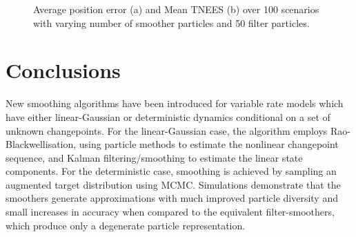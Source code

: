 \documentclass[peerreview,11pt,draftcls,onecolumn]{IEEEtran}
\begin{document}
\begin{figure}
\centering
{}
\caption{Average position error (a) and Mean TNEES (b) over 100 scenarios with varying number of smoother particles and 50 filter particles.}
\label{fig:varying_num_pts}
\end{figure}



\section{Conclusions}

New smoothing algorithms have been introduced for variable rate models which have either linear-Gaussian or deterministic dynamics conditional on a set of unknown changepoints. For the linear-Gaussian case, the algorithm employs Rao-Blackwellisation, using particle methods to estimate the nonlinear changepoint sequence, and Kalman filtering/smoothing to estimate the linear state components. For the deterministic case, smoothing is achieved by sampling an augmented target distribution using MCMC. Simulations demonstrate that the smoothers generate approximations with much improved particle diversity and small increases in accuracy when compared to the equivalent filter-smoothers, which produce only a degenerate particle representation.
\end{document}

